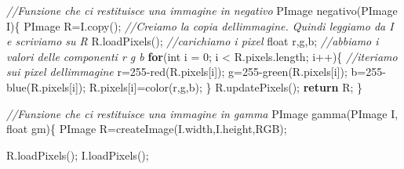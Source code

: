 \documentclass[
]{article}
\newenvironment{Shaded}{}{}
\newcommand{\CommentTok}[1]{\textcolor[rgb]{0.38,0.63,0.69}{\textit{#1}}}
\newcommand{\ControlFlowTok}[1]{\textcolor[rgb]{0.00,0.44,0.13}{\textbf{#1}}}
\newcommand{\DataTypeTok}[1]{\textcolor[rgb]{0.56,0.13,0.00}{#1}}
\newcommand{\DecValTok}[1]{\textcolor[rgb]{0.25,0.63,0.44}{#1}}
\newcommand{\FunctionTok}[1]{\textcolor[rgb]{0.02,0.16,0.49}{#1}}
\newcommand{\NormalTok}[1]{#1}
\newcommand{\OperatorTok}[1]{\textcolor[rgb]{0.40,0.40,0.40}{#1}}
\begin{document}
\begin{Shaded}
\begin{Highlighting}[]
\CommentTok{//Funzione che ci restituisce una immagine in negativo}
\NormalTok{PImage }\FunctionTok{negativo}\OperatorTok{(}\NormalTok{PImage I}\OperatorTok{)\{}
\NormalTok{  PImage R}\OperatorTok{=}\NormalTok{I}\OperatorTok{.}\FunctionTok{copy}\OperatorTok{();} \CommentTok{//Creiamo la copia dell\textquotesingle{}immagine. Quindi leggiamo da I e scriviamo su R}
\NormalTok{   R}\OperatorTok{.}\FunctionTok{loadPixels}\OperatorTok{();} \CommentTok{//carichiamo i pixel}
   \DataTypeTok{float}\NormalTok{ r}\OperatorTok{,}\NormalTok{g}\OperatorTok{,}\NormalTok{b}\OperatorTok{;}  \CommentTok{//abbiamo i valori delle componenti r g b}
   \ControlFlowTok{for}\OperatorTok{(}\DataTypeTok{int}\NormalTok{ i }\OperatorTok{=} \DecValTok{0}\OperatorTok{;}\NormalTok{ i }\OperatorTok{\textless{}}\NormalTok{ R}\OperatorTok{.}\FunctionTok{pixels}\OperatorTok{.}\FunctionTok{length}\OperatorTok{;}\NormalTok{ i}\OperatorTok{++)\{} \CommentTok{//iteriamo sui pixel dell\textquotesingle{}immagine}
\NormalTok{     r}\OperatorTok{=}\DecValTok{255}\OperatorTok{{-}}\FunctionTok{red}\OperatorTok{(}\NormalTok{R}\OperatorTok{.}\FunctionTok{pixels}\OperatorTok{[}\NormalTok{i}\OperatorTok{]);}
\NormalTok{     g}\OperatorTok{=}\DecValTok{255}\OperatorTok{{-}}\FunctionTok{green}\OperatorTok{(}\NormalTok{R}\OperatorTok{.}\FunctionTok{pixels}\OperatorTok{[}\NormalTok{i}\OperatorTok{]);}
\NormalTok{     b}\OperatorTok{=}\DecValTok{255}\OperatorTok{{-}}\FunctionTok{blue}\OperatorTok{(}\NormalTok{R}\OperatorTok{.}\FunctionTok{pixels}\OperatorTok{[}\NormalTok{i}\OperatorTok{]);}
\NormalTok{     R}\OperatorTok{.}\FunctionTok{pixels}\OperatorTok{[}\NormalTok{i}\OperatorTok{]=}\FunctionTok{color}\OperatorTok{(}\NormalTok{r}\OperatorTok{,}\NormalTok{g}\OperatorTok{,}\NormalTok{b}\OperatorTok{);}
   \OperatorTok{\}}
\NormalTok{   R}\OperatorTok{.}\FunctionTok{updatePixels}\OperatorTok{();}
   \ControlFlowTok{return}\NormalTok{ R}\OperatorTok{;}
\OperatorTok{\}}

\CommentTok{//Funzione che ci restituisce una immagine in gamma}
\NormalTok{PImage }\FunctionTok{gamma}\OperatorTok{(}\NormalTok{PImage I}\OperatorTok{,} \DataTypeTok{float}\NormalTok{ gm}\OperatorTok{)\{}
\NormalTok{  PImage R}\OperatorTok{=}\FunctionTok{createImage}\OperatorTok{(}\NormalTok{I}\OperatorTok{.}\FunctionTok{width}\OperatorTok{,}\NormalTok{I}\OperatorTok{.}\FunctionTok{height}\OperatorTok{,}\NormalTok{RGB}\OperatorTok{);}
 
\NormalTok{  R}\OperatorTok{.}\FunctionTok{loadPixels}\OperatorTok{();}
\NormalTok{  I}\OperatorTok{.}\FunctionTok{loadPixels}\OperatorTok{();}
  

\end{Highlighting}
\end{Shaded}
\end{document}
